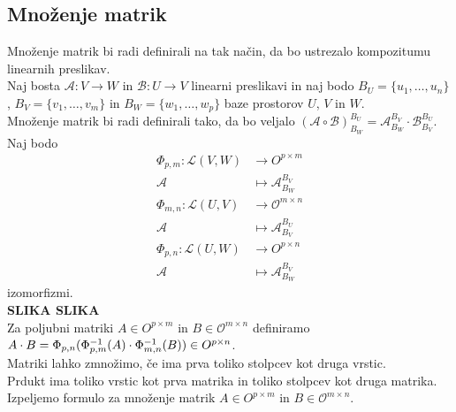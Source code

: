 \documentclass[a4paper,12pt]{article}
\begin{document}
\newpage 

\subsection{Množenje matrik}

Množenje matrik bi radi definirali na tak način, da bo ustrezalo kompozitumu linearnih preslikav. \\

Naj bosta $\mathcal{A}:V\to W$ in $\mathcal{B}:U\to V$ linearni preslikavi  in naj bodo $B_U=\{u_1,\ldots,u_n\}$, $B_V=\{v_1,\ldots,v_m\}$ in $B_W=\{w_1,\ldots,w_p\}$ baze prostorov $U$, $V$ in $W$. \\

Množenje matrik bi radi definirali tako, da bo veljalo $(\mathcal{A}\circ \mathcal{B})_{B_W}^{B_U}=\mathcal{A}_{B_W}^{B_V} \cdot \mathcal{B}_{B_V}^{B_U}$. \\

Naj bodo 
\begin{align*}
	\Phi_{p,m}: \mathcal{L}(V,W) & \to O^{p\times m}\\
	 \mathcal{A} & \mapsto \mathcal{A}_{B_W}^{B_V} \\
	\Phi_{m,n}: \mathcal{L}(U,V) & \to \mathcal{O}^{m\times n} \\
	 \mathcal{A} & \mapsto \mathcal{A}_{B_V}^{B_U} \\
	\Phi_{p,n}: \mathcal{L}(U,W) & \to O^{p\times n} \\
	 \mathcal{A} & \mapsto \mathcal{A}_{B_W}^{B_V}
\end{align*} 
izomorfizmi. \\

\textbf{SLIKA SLIKA} \\

Za poljubni matriki $A\in O^{p\times m}$ in $B\in \mathcal{O}^{m\times n}$ definiramo $A\cdot B=\Phi_{p,n} (\Phi_{p,m}^{-1}(A)\cdot \Phi_{m,n}^{-1}(B))\linebreak \in O^{p\times n}$. \\

Matriki lahko zmnožimo, če ima prva toliko stolpcev kot druga vrstic. \\

Prdukt ima toliko vrstic kot prva matrika in toliko stolpcev kot druga matrika. \\

Izpeljemo formulo za množenje matrik $A\in O^{p\times m}$ in $B\in \mathcal{O}^{m\times n}$. \\
\end{document}
